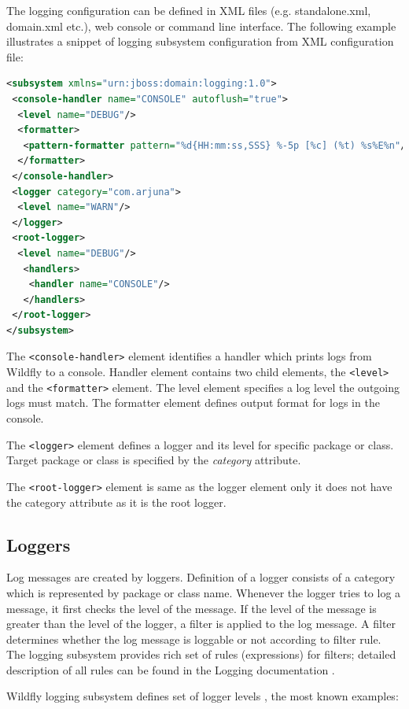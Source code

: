 \documentclass[12pt,oneside]{fithesis2}
\begin{document}
The logging configuration can be defined in XML files (e.g. standalone.xml, domain.xml etc.), web console or command line interface. The following example illustrates a snippet of logging subsystem configuration from XML configuration file:

\begin{lstlisting}[caption = Configuring logging subsystem, label = logging_subsystem, language=XML]
<subsystem xmlns="urn:jboss:domain:logging:1.0">
 <console-handler name="CONSOLE" autoflush="true">
  <level name="DEBUG"/>
  <formatter>
   <pattern-formatter pattern="%d{HH:mm:ss,SSS} %-5p [%c] (%t) %s%E%n"/>
  </formatter>
 </console-handler>
 <logger category="com.arjuna">
  <level name="WARN"/>
 </logger>
 <root-logger>
  <level name="DEBUG"/>
   <handlers>
    <handler name="CONSOLE"/>
   </handlers>
 </root-logger>
</subsystem>
\end{lstlisting}
\noindent
The \verb|<console-handler>| element identifies a handler which prints logs from Wildfly to a console. Handler element contains two child elements, the \verb|<level>| and the \verb|<formatter>| element. The level element specifies a log level the outgoing logs must match. The formatter element defines output format for logs in the console.

The \verb|<logger>| element defines a logger and its level for specific package or class. Target package or class is specified by the \textit{category} attribute.

The \verb|<root-logger>| element is same as the logger element only it does not have the category attribute as it is the root logger.


\subsection{Loggers}
Log messages are created by loggers. Definition of a logger consists of a category which is represented by package or class name. Whenever the logger tries to log a message, it first checks the level of the message. If the level of the message is greater than the level of the logger, a filter is applied to the log message.  A filter determines whether the log message is loggable or not according to filter rule. The logging subsystem provides rich set of rules (expressions) for filters; detailed description of all rules can be found in the Logging documentation \cite[Logging Configuration]{wildfly_doc}.

Wildfly logging subsystem defines set of logger levels \cite[Logging Configuration]{wildfly_doc}, the most known examples:
\end{document}
